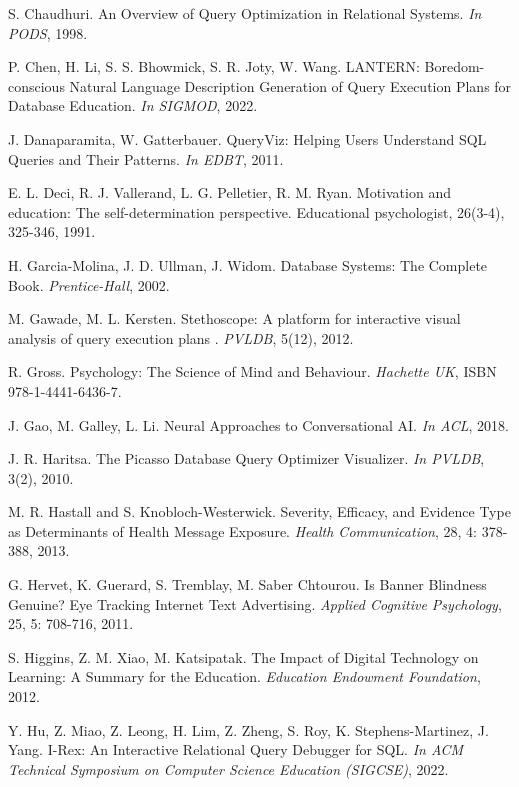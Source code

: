 \documentclass[11pt]{article}
\begin{document}
\begin{thebibliography}{10}
\begin{small}
 S. Chaudhuri. An Overview of Query Optimization in Relational Systems. \textit{In PODS}, 1998.

 P. Chen, H. Li, S. S. Bhowmick, S. R. Joty, W. Wang. LANTERN: Boredom-conscious Natural Language Description Generation of Query Execution Plans for Database Education.\textit{ In SIGMOD}, 2022.

 J. Danaparamita, W. Gatterbauer. QueryViz: Helping Users Understand SQL Queries and Their Patterns. \textit{In EDBT}, 2011.

 E. L. Deci, R. J. Vallerand, L. G. Pelletier, R. M. Ryan. Motivation and education: The self-determination perspective. Educational psychologist, 26(3-4), 325-346, 1991.

 H. Garcia-Molina, J. D. Ullman, J. Widom. Database Systems: The Complete Book. \textit{Prentice-Hall}, 2002.

 M. Gawade, M. L. Kersten. Stethoscope: A platform for interactive visual analysis of query execution plans . \textit{PVLDB}, 5(12), 2012.

 R. Gross. Psychology: The Science of Mind and Behaviour. \textit{Hachette UK}, ISBN 978-1-4441-6436-7.

 J. Gao, M. Galley, L. Li. Neural Approaches to Conversational AI. \textit{In ACL}, 2018.

 J. R. Haritsa.  The Picasso Database Query Optimizer Visualizer. \textit{In PVLDB}, 3(2), 2010.

 M. R. Hastall and S. Knobloch-Westerwick. Severity, Efficacy, and Evidence Type as Determinants of Health Message Exposure. \textit{Health Communication}, 28, 4: 378-388, 2013.

 G. Hervet, K. Guerard, S. Tremblay, M. Saber Chtourou. Is Banner Blindness Genuine? Eye Tracking Internet Text
Advertising. \textit{Applied Cognitive Psychology}, 25, 5: 708-716, 2011.

 S. Higgins, Z. M. Xiao, M. Katsipatak. The Impact of Digital Technology on Learning: A Summary for the Education. \textit{Education Endowment Foundation}, 2012.

 Y. Hu, Z. Miao, Z. Leong, H. Lim, Z. Zheng, S. Roy, K. Stephens-Martinez, J. Yang. I-Rex: An Interactive Relational Query Debugger for SQL. \textit{In ACM Technical Symposium on Computer Science Education (SIGCSE)}, 2022.


\end{small}
\end{thebibliography}
\end{document}
